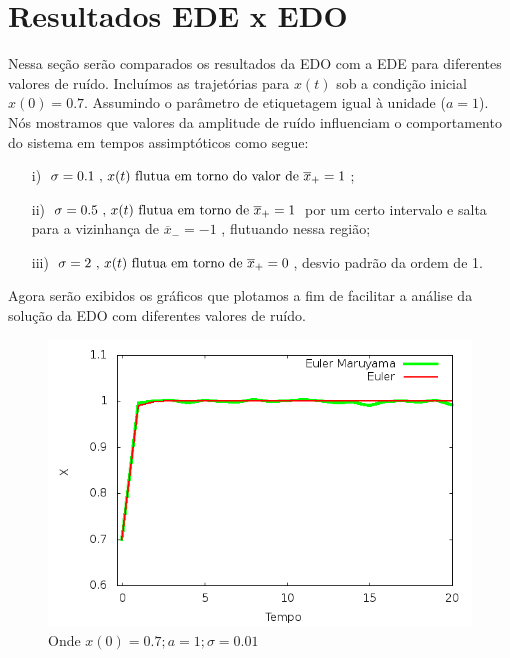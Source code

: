 \section{Resultados EDE x EDO}
Nessa seção serão comparados os resultados da EDO com a EDE para diferentes valores de ruído.
Incluímos as trajetórias para $x(t)$ sob a condição inicial $x(0) = 0.7$. Assumindo o parâmetro de etiquetagem igual à unidade ($a=1$). Nós mostramos que valores da amplitude de ruído influenciam o comportamento do sistema em tempos assimptóticos como segue:

\begin{itemize}
\item[i)]   $\sigma = 0.1 \textrm{ , } x(t) \textrm{ \mbox{f}lutua em torno do valor de } \overline{x}_{+} = 1$;

\item[ii)]  $\sigma = 0.5\textrm{ , } x(t) \textrm{ \mbox{f}lutua em torno de } \overline{x}_{+} = 1$ 
por um certo intervalo e salta para a vizinhança de $\overline{x}_{-} = -1$ , flutuando nessa região;

\item[iii)] $\sigma = 2 \textrm{ , } x(t) \textrm{ \mbox{f}lutua em torno de } \overline{x}_{+} = 0$, desvio padrão da ordem de 1.
\end{itemize}

Agora serão exibidos os gráficos que plotamos a fim de facilitar a análise da solução da 
EDO com diferentes valores de ruído.

\begin{figure}[!htb]
\centering
\begin{minipage}[b]{0.55\linewidth}
\includegraphics[width=\linewidth]{./img/Langevin_CI07_ruido001.png}
\caption{Onde $x(0) = 0.7 ; a = 1 ; \sigma = 0.01$}
\label{fig1}
\end{minipage} \hfill
\end{figure}

